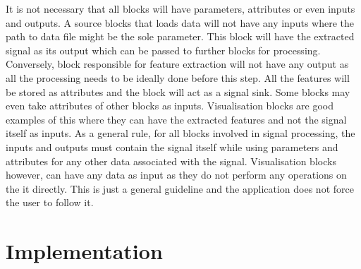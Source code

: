 \documentclass[journal]{IEEEtran}
\begin{document}
It is not necessary that all blocks will have parameters, attributes or even inputs and outputs. A source blocks that loads data will not have any inputs where the path to data file might be the sole parameter. This block will have the extracted signal as its output which can be passed to further blocks for processing. Conversely, block responsible for feature extraction will not have any output as all the processing needs to be ideally done before this step. All the features will be stored as attributes and the block will act as a signal sink. Some blocks may even take attributes of other blocks as inputs. Visualisation blocks are good examples of this where they can have the extracted features and not the signal itself as inputs. As a general rule, for all blocks involved in signal processing, the inputs and outputs must contain the signal itself while using parameters and attributes for any other data associated with the signal. Visualisation blocks however, can have any data as input as they do not perform any operations on the it directly. This is just a general guideline and the application does not force the user to follow it.

\section{Implementation}
\end{document}
